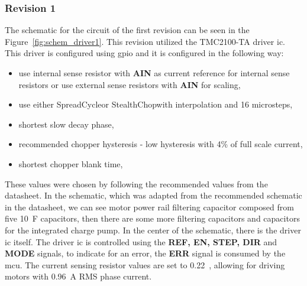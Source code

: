 \subsubsection{Revision 1}
The schematic for the circuit of the first revision can be seen in the Figure~\ref{fig:schem_driver1}.
This revision utilized the TMC2100-TA driver \acs{ic}.
This driver is configured using \acs{gpio} and it is configured in the following way:
\begin{itemize}
    \item use internal sense resistor with \textbf{AIN} as current reference for internal sense resistors or use external sense resistors with \textbf{AIN} for scaling,
    \item use either SpreadCycle\texttrademark or StealthChop\texttrademark with interpolation and 16 microsteps,
    \item shortest slow decay phase,
    \item recommended chopper hysteresis - low hysteresis with 4\% of full scale current,
    \item shortest chopper blank time,
\end{itemize}
These values were chosen by following the recommended values from the datasheet.
In the schematic, which was adapted from the recommended schematic in the datasheet\cite{trinamic_tmc2100-datasheet_2018}, we can see motor power rail filtering capacitor composed from five 10~\textmu F capacitors, then there are some more filtering capacitors and capacitors for the integrated charge pump.
In the center of the schematic, there is the driver \acs{ic} itself.
The driver \acs{ic} is controlled using the \textbf{REF, EN, STEP, DIR} and \textbf{MODE} signals, to indicate for an error, the \textbf{ERR} signal is consumed by the \acs{mcu}.
The current sensing resistor values are set to 0.22~\textohm, allowing for driving motors with 0.96~A RMS phase current.

